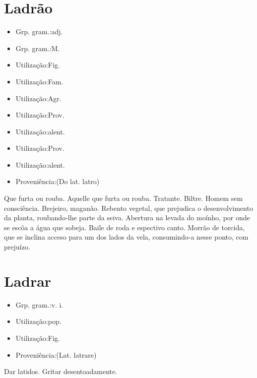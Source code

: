 \section{Ladrão}
\begin{itemize}
\item {Grp. gram.:adj.}
\end{itemize}
\begin{itemize}
\item {Grp. gram.:M.}
\end{itemize}
\begin{itemize}
\item {Utilização:Fig.}
\end{itemize}
\begin{itemize}
\item {Utilização:Fam.}
\end{itemize}
\begin{itemize}
\item {Utilização:Agr.}
\end{itemize}
\begin{itemize}
\item {Utilização:Prov.}
\end{itemize}
\begin{itemize}
\item {Utilização:alent.}
\end{itemize}
\begin{itemize}
\item {Utilização:Prov.}
\end{itemize}
\begin{itemize}
\item {Utilização:alent.}
\end{itemize}
\begin{itemize}
\item {Proveniência:(Do lat. \textunderscore latro\textunderscore )}
\end{itemize}
Que furta ou rouba.
Aquelle que furta ou rouba.
Tratante.
Biltre.
Homem sem consciência.
Brejeiro, maganão.
Rebento vegetal, que prejudica o desenvolvimento da planta, roubando-lhe parte da seiva.
Abertura na levada do moínho, por onde se escôa a água que sobeja.
Baile de roda e espectivo canto.
Morrão de torcida, que se inclina acceso para um dos lados da vela, consumindo-a nesse ponto, com prejuízo.
\section{Ladrar}
\begin{itemize}
\item {Grp. gram.:v. i.}
\end{itemize}
\begin{itemize}
\item {Utilização:pop.}
\end{itemize}
\begin{itemize}
\item {Utilização:Fig.}
\end{itemize}
\begin{itemize}
\item {Proveniência:(Lat. \textunderscore latrare\textunderscore )}
\end{itemize}
Dar latidos.
Gritar desentoadamente.
